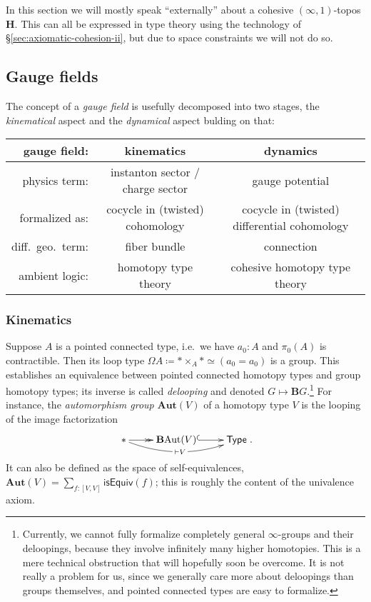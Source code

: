 \documentclass[copyright,12pt]{eptcs}
\newcommand{\type}{\ensuremath{\mathsf{Type}}\xspace}
\renewcommand{\H}{\ensuremath{\mathbf{H}}\xspace}
\newcommand{\io}{\ensuremath{(\infty,1)}}
\begin{document}
In this section we will mostly speak ``externally'' about a cohesive \io-topos \H.
This can all be expressed in type theory using the technology of \S\ref{sec:axiomatic-cohesion-ii}, but due to space constraints we will not do so.


\subsection{Gauge fields}

The concept of a \emph{gauge field} is usefully decomposed into two stages, the \emph{kinematical}
aspect and the \emph{dynamical} aspect bulding on that:

\bigskip
{\small
\hspace{-.6cm}
\begin{tabular}{|r||c|c|}
  \hline
  {\bf gauge field:} & {\bf kinematics} & {\bf dynamics}
  \\
  \hline
  \hline
  physics  term: &
  instanton sector / charge sector
  & gauge potential
  \\
  \hline
  formalized as: & cocycle in (twisted) cohomology & cocycle in (twisted) differential cohomology
  \\
  \hline
     diff.\ geo.\
     term:
  &
  fiber bundle
  &
  connection
  \\
  \hline
  ambient logic:
  & homotopy type theory & cohesive homotopy type theory
  \\
  \hline
\end{tabular}
}

\subsubsection{Kinematics}

Suppose $A$ is a pointed connected type, i.e.\ we have $a_0:A$ and $\pi_0(A)$ is contractible.
Then its loop type $\Omega A \coloneqq * \times_A * \simeq (a_0 = a_0)$ is
a group. This establishes an equivalence between pointed connected homotopy types and
group homotopy types; its inverse is called
\emph{delooping} and denoted $G \mapsto \mathbf{B}G$.\footnote{Currently, we cannot fully formalize completely general $\infty$-groups and their deloopings, because they involve infinitely many higher homotopies.  This is a mere technical obstruction that will hopefully soon be overcome.
It is not really a problem for us, since we generally care more about deloopings than groups themselves, and pointed connected types are easy to formalize.}
For instance, the
\emph{automorphism group} $\mathbf{Aut}(V)$ of a homotopy type $V$ is the looping of the image factorization
\[\xymatrix{
    {*} \ar@{->>}[r] \ar@/_1pc/[rr]|{\;\vdash V\;} & \mathbf{B}\mathrm{Aut}(V) \ar@{^{(}->}[r] & \type
  }.\]
It can also be defined as the space of self-equivalences, $\mathbf{Aut}(V) = \sum_{f:[V,V]}\mathsf{isEquiv}(f)$; this is roughly the content of the univalence axiom.
\end{document}
